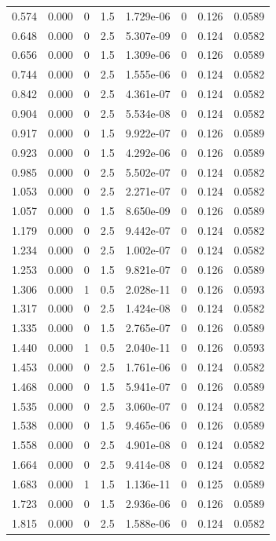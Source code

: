 \documentclass[preview]{standalone}
\begin{document}
{{\begin{tabular}{L{1.2cm}C{1.2cm} C{0.3cm}C{0.5cm} C{1.4cm}C{1.4cm} C{1.4cm}C{1.4cm}}
  0.574  &  0.000  & 0     & 1.5 &  1.729e-06  & 0  & 0.126 &  0.0589   \\ 
  0.648  &  0.000  & 0     & 2.5 &  5.307e-09  & 0  & 0.124 &  0.0582   \\ 
  0.656  &  0.000  & 0     & 1.5 &  1.309e-06  & 0  & 0.126 &  0.0589   \\ 
  0.744  &  0.000  & 0     & 2.5 &  1.555e-06  & 0  & 0.124 &  0.0582   \\ 
  0.842  &  0.000  & 0     & 2.5 &  4.361e-07  & 0  & 0.124 &  0.0582   \\ 
  0.904  &  0.000  & 0     & 2.5 &  5.534e-08  & 0  & 0.124 &  0.0582   \\ 
  0.917  &  0.000  & 0     & 1.5 &  9.922e-07  & 0  & 0.126 &  0.0589   \\ 
  0.923  &  0.000  & 0     & 1.5 &  4.292e-06  & 0  & 0.126 &  0.0589   \\ 
  0.985  &  0.000  & 0     & 2.5 &  5.502e-07  & 0  & 0.124 &  0.0582   \\ 
  1.053  &  0.000  & 0     & 2.5 &  2.271e-07  & 0  & 0.124 &  0.0582   \\ 
  1.057  &  0.000  & 0     & 1.5 &  8.650e-09  & 0  & 0.126 &  0.0589   \\ 
  1.179  &  0.000  & 0     & 2.5 &  9.442e-07  & 0  & 0.124 &  0.0582   \\ 
  1.234  &  0.000  & 0     & 2.5 &  1.002e-07  & 0  & 0.124 &  0.0582   \\ 
  1.253  &  0.000  & 0     & 1.5 &  9.821e-07  & 0  & 0.126 &  0.0589   \\ 
  1.306  &  0.000  & 1     & 0.5 &  2.028e-11  & 0  & 0.126 &  0.0593   \\ 
  1.317  &  0.000  & 0     & 2.5 &  1.424e-08  & 0  & 0.124 &  0.0582   \\ 
  1.335  &  0.000  & 0     & 1.5 &  2.765e-07  & 0  & 0.126 &  0.0589   \\ 
  1.440  &  0.000  & 1     & 0.5 &  2.040e-11  & 0  & 0.126 &  0.0593   \\ 
  1.453  &  0.000  & 0     & 2.5 &  1.761e-06  & 0  & 0.124 &  0.0582   \\ 
  1.468  &  0.000  & 0     & 1.5 &  5.941e-07  & 0  & 0.126 &  0.0589   \\ 
  1.535  &  0.000  & 0     & 2.5 &  3.060e-07  & 0  & 0.124 &  0.0582   \\ 
  1.538  &  0.000  & 0     & 1.5 &  9.465e-06  & 0  & 0.126 &  0.0589   \\ 
  1.558  &  0.000  & 0     & 2.5 &  4.901e-08  & 0  & 0.124 &  0.0582   \\ 
  1.664  &  0.000  & 0     & 2.5 &  9.414e-08  & 0  & 0.124 &  0.0582   \\ 
  1.683  &  0.000  & 1     & 1.5 &  1.136e-11  & 0  & 0.125 &  0.0589   \\ 
  1.723  &  0.000  & 0     & 1.5 &  2.936e-06  & 0  & 0.126 &  0.0589   \\ 
  1.815  &  0.000  & 0     & 2.5 &  1.588e-06  & 0  & 0.124 &  0.0582   \\ 
\hline 
\end{tabular} 

}}
\end{document}
